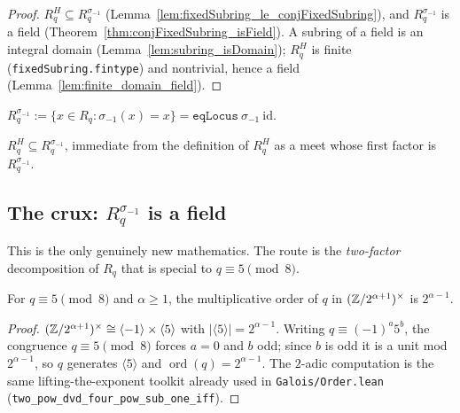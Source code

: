 \begin{proof}
\leanok{}
$R_q^H \subseteq R_q^{\sigma_{-1}}$ (Lemma~\ref{lem:fixedSubring_le_conjFixedSubring}), and
$R_q^{\sigma_{-1}}$ is a field (Theorem~\ref{thm:conjFixedSubring_isField}). A subring of a field
is an integral domain (Lemma~\ref{lem:subring_isDomain}); $R_q^H$ is finite
(\texttt{fixedSubring.fintype}) and nontrivial, hence a field
(Lemma~\ref{lem:finite_domain_field}).
\end{proof}

\begin{definition}\label{def:conjFixedSubring}
\leanok
$R_q^{\sigma_{-1}} := \{x \in R_q : \sigma_{-1}(x) = x\} = \texttt{eqLocus}\ \sigma_{-1}\ \mathrm{id}$.
\end{definition}

\begin{lemma}[$R_q^H \le R_q^{\sigma_{-1}}$]\label{lem:fixedSubring_le_conjFixedSubring}
\leanok
{}
$R_q^H \subseteq R_q^{\sigma_{-1}}$, immediate from the definition of $R_q^H$ as a meet whose first
factor is $R_q^{\sigma_{-1}}$.
\end{lemma}

\subsection{The crux: \texorpdfstring{$R_q^{\sigma_{-1}}$}{R\_q\^{}σ(-1)} is a field}

This is the only genuinely new mathematics. The route is the \emph{two-factor} decomposition of
$R_q$ that is special to $q \equiv 5 \pmod 8$.

\begin{lemma}\label{lem:order_q}
\leanok
For $q \equiv 5 \pmod 8$ and $\alpha \ge 1$, the multiplicative order of $q$ in
$(\mathbb{Z}/2^{\alpha+1})^\times$ is $2^{\alpha-1}$.
\end{lemma}

\begin{proof}
\leanok
$(\mathbb{Z}/2^{\alpha+1})^\times \cong \langle -1\rangle \times \langle 5\rangle$ with
$|\langle 5\rangle| = 2^{\alpha-1}$. Writing $q \equiv (-1)^a 5^b$, the congruence $q \equiv 5
\pmod 8$ forces $a = 0$ and $b$ odd; since $b$ is odd it is a unit mod $2^{\alpha-1}$, so
$q$ generates $\langle 5\rangle$ and $\operatorname{ord}(q) = 2^{\alpha-1}$. The $2$-adic
computation is the same lifting-the-exponent toolkit already used in
\texttt{Galois/Order.lean} (\texttt{two\_pow\_dvd\_four\_pow\_sub\_one\_iff}).
\end{proof}


